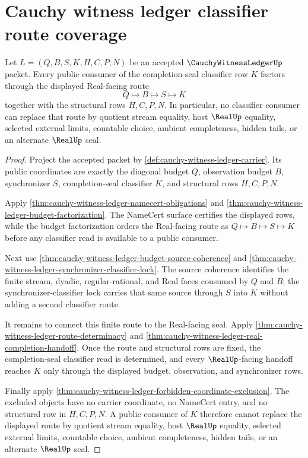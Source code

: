 \section{Cauchy witness ledger classifier route coverage}
\label{sec:cauchy-witness-ledger-classifier-route-coverage}

\begin{theorem}
\label{thm:cauchy-witness-ledger-classifier-route-coverage}
Let $L=(Q,B,S,K,H,C,P,N)$ be an accepted $\CauchyWitnessLedgerUp$ packet.
Every public consumer of the completion-seal classifier row $K$ factors through
the displayed Real-facing route
$$
Q \longmapsto B \longmapsto S \longmapsto K
$$
together with the structural rows $H,C,P,N$. In particular, no classifier
consumer can replace that route by quotient stream equality, host $\RealUp$
equality, selected external limits, countable choice, ambient completeness,
hidden tails, or an alternate $\RealUp$ seal.
\end{theorem}
\begin{proof}
Project the accepted packet by
\autoref{def:cauchy-witness-ledger-carrier}. Its public coordinates are
exactly the diagonal budget $Q$, observation budget $B$, synchronizer $S$,
completion-seal classifier $K$, and structural rows $H,C,P,N$.

Apply \autoref{thm:cauchy-witness-ledger-namecert-obligations} and
\autoref{thm:cauchy-witness-ledger-budget-factorization}. The NameCert surface
certifies the displayed rows, while the budget factorization orders the
Real-facing route as $Q \longmapsto B \longmapsto S \longmapsto K$ before any
classifier read is available to a public consumer.

Next use \autoref{thm:cauchy-witness-ledger-budget-source-coherence} and
\autoref{thm:cauchy-witness-ledger-synchronizer-classifier-lock}. The source
coherence identifies the finite stream, dyadic, regular-rational, and Real
faces consumed by $Q$ and $B$; the synchronizer-classifier lock carries that
same source through $S$ into $K$ without adding a second classifier route.

It remains to connect this finite route to the Real-facing seal. Apply
\autoref{thm:cauchy-witness-ledger-route-determinacy} and
\autoref{thm:cauchy-witness-ledger-real-completion-handoff}. Once the route
and structural rows are fixed, the completion-seal classifier read is
determined, and every $\RealUp$-facing handoff reaches $K$ only through the
displayed budget, observation, and synchronizer rows.

Finally apply \autoref{thm:cauchy-witness-ledger-forbidden-coordinate-exclusion}.
The excluded objects have no carrier coordinate, no NameCert entry, and no
structural row in $H,C,P,N$. A public consumer of $K$ therefore cannot replace
the displayed route by quotient stream equality, host $\RealUp$ equality,
selected external limits, countable choice, ambient completeness, hidden tails,
or an alternate $\RealUp$ seal.
\end{proof}
